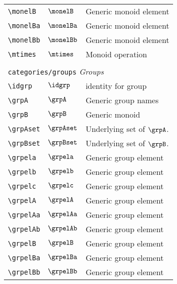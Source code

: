 \begin{longtable}{lll}
 {\color[rgb]{0.5,0.5,0.5}\texttt{\textbackslash monelB}} & $\monelB$ &  Generic monoid element\\ 
 {\color[rgb]{0.5,0.5,0.5}\texttt{\textbackslash monelBa}} & $\monelBa$ &  Generic monoid element\\ 
 {\color[rgb]{0.5,0.5,0.5}\texttt{\textbackslash monelBb}} & $\monelBb$ &  Generic monoid element\\ 
 {\color[rgb]{0.5,0.5,0.5}\texttt{\textbackslash mtimes}} & $\mtimes$ &  Monoid operation\\ 
  &  & \\ 
 \multicolumn{3}{l}{{\color[rgb]{0.5,0.5,0.5}\texttt{categories/groups}} \emph{Groups}}\\ 
 \hline
{\color[rgb]{0.5,0.5,0.5}\texttt{\textbackslash idgrp}} & $\idgrp$ &  identity for group\\ 
 {\color[rgb]{0.5,0.5,0.5}\texttt{\textbackslash grpA}} & $\grpA$ &  Generic group names\\ 
 {\color[rgb]{0.5,0.5,0.5}\texttt{\textbackslash grpB}} & $\grpB$ &  Generic monoid\\ 
 {\color[rgb]{0.5,0.5,0.5}\texttt{\textbackslash grpAset}} & $\grpAset$ &  Underlying set of $\grpA$.\\ 
 {\color[rgb]{0.5,0.5,0.5}\texttt{\textbackslash grpBset}} & $\grpBset$ &  Underlying set of $\grpB$.\\ 
 {\color[rgb]{0.5,0.5,0.5}\texttt{\textbackslash grpela}} & $\grpela$ &  Generic group element\\ 
 {\color[rgb]{0.5,0.5,0.5}\texttt{\textbackslash grpelb}} & $\grpelb$ &  Generic group element\\ 
 {\color[rgb]{0.5,0.5,0.5}\texttt{\textbackslash grpelc}} & $\grpelc$ &  Generic group element\\ 
 {\color[rgb]{0.5,0.5,0.5}\texttt{\textbackslash grpelA}} & $\grpelA$ &  Generic group element\\ 
 {\color[rgb]{0.5,0.5,0.5}\texttt{\textbackslash grpelAa}} & $\grpelAa$ &  Generic group element\\ 
 {\color[rgb]{0.5,0.5,0.5}\texttt{\textbackslash grpelAb}} & $\grpelAb$ &  Generic group element\\ 
 {\color[rgb]{0.5,0.5,0.5}\texttt{\textbackslash grpelB}} & $\grpelB$ &  Generic group element\\ 
 {\color[rgb]{0.5,0.5,0.5}\texttt{\textbackslash grpelBa}} & $\grpelBa$ &  Generic group element\\ 
 {\color[rgb]{0.5,0.5,0.5}\texttt{\textbackslash grpelBb}} & $\grpelBb$ &  Generic group element\\ 

\end{longtable}

